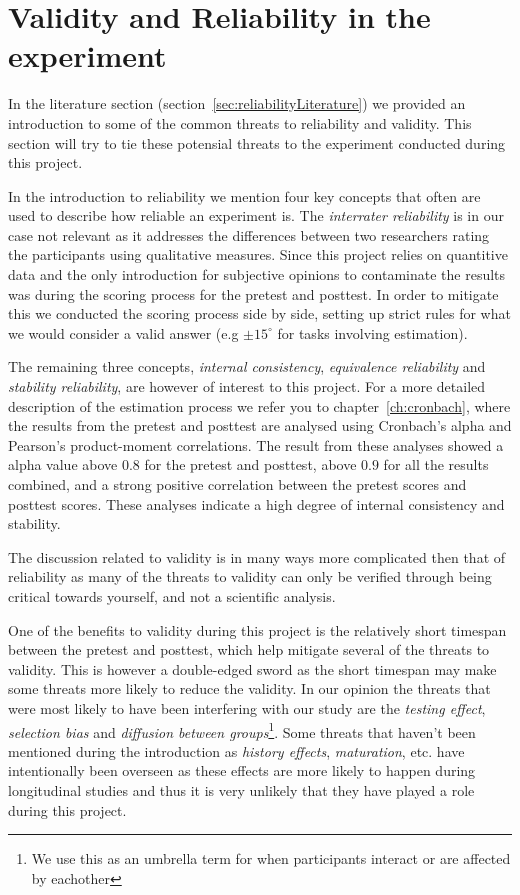 \section{Validity and Reliability in the experiment}
	In the literature section (section~\ref{sec:reliabilityLiterature}) we provided an introduction to some of the common threats to reliability and validity. This section will try to tie these potensial threats to the experiment conducted during this project.
	
	\bigskip\noindent
	In the introduction to reliability we mention four key concepts that often are used to describe how reliable an experiment is. The \textit{interrater reliability} is in our case not relevant as it addresses the differences between two researchers rating the participants using qualitative measures. Since this project relies on quantitive data and the only introduction for subjective opinions to contaminate the results was during the scoring process for the pretest and posttest. In order to mitigate this we conducted the scoring process side by side, setting up strict rules for what we would consider a valid answer (e.g $\pm 15^{\circ}$ for tasks involving estimation).
	
	\bigskip\noindent
	The remaining three concepts, \textit{internal consistency}, \textit{equivalence reliability} and \textit{stability reliability}, are however of interest to this project. 
	For a more detailed description of the estimation process we refer you to chapter~\ref{ch:cronbach}, where the results from the pretest and posttest are analysed using Cronbach's alpha and Pearson's product-moment correlations. The result from these analyses showed a alpha value above $0.8$ for the pretest and posttest, above $0.9$ for all the results combined, and a strong positive correlation between the pretest scores and posttest scores. These analyses indicate a high degree of internal consistency and stability.
	
	\bigskip\noindent
	The discussion related to validity is in many ways more complicated then that of reliability as many of the threats to validity can only be verified through being critical towards yourself, and not a scientific analysis. 
	
	\bigskip\noindent
	One of the benefits to validity during this project is the relatively short timespan between the pretest and posttest, which help mitigate several of the threats to validity. This is however a double-edged sword as the short timespan may make some threats more likely to reduce the validity. In our opinion the threats that were most likely to have been interfering with our study are the \textit{testing effect}, \textit{selection bias} and \textit{diffusion between groups}\footnote{We use this as an umbrella term for when participants interact or are affected by eachother}. 
	Some threats that haven't been mentioned during the introduction as \textit{history effects}, \textit{maturation}, etc. have intentionally been overseen as these effects are more likely to happen during longitudinal studies and thus it is very unlikely that they have played a role during this project. 
	
